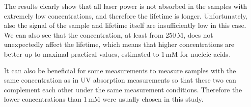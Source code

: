 \begin{table}
	\centering
	
	\caption[%
		Lifetimes of the polyU in dependence on concentration
		estimated from raw spectra in backscattering geometry.%
	]{%
		$E_0$ are total energies accumulated by the detector divided by the
		maximal value across all the concentrations $c$ and normalized to the
		concentration.
	}
	\label{\tablabel{conc_optim:lifetimes_hairpins}}
\end{table}

The results clearly show that all laser power is not absorbed in the samples
with extremely low concentrations, and therefore the lifetime is longer.
Unfortunately, also the signal of the sample and lifetime itself are
insufficiently low in this case.
We can also see that the concentration, at least from 250\,M, does not
unexpectedly affect the lifetime, which means that higher concentrations are
better up to maximal practical values, estimated to 1\,mM for nucleic acids.

It can also be beneficial for some measurements to measure samples with the
same concentration as in UV absorption measurements so that these two can
complement each other under the same measurement conditions.
Therefore the lower concentrations than 1\,mM were usually chosen in this
study.
